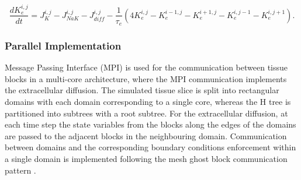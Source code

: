 		\begin{equation}
		\frac{d K_e^{i,j}}{dt} = J_K^{i,j} - J_{NaK}^{i,j} - J_{diff}^{i,j} - \frac{1}{\tau_e} 
		\left( 4  K_e^{i,j} -  K_e^{i-1,j} - K_e^{i+1,j} - K_e^{i,j-1} - K_e^{i,j+1}
		\right).
		\end{equation}
		
		\subsubsection{Parallel Implementation}	
		Message Passing Interface (MPI) is used for the communication between tissue blocks in a multi-core architecture, where the MPI communication implements the extracellular diffusion. The simulated tissue slice is split into rectangular domains with each domain corresponding to a single core, whereas the H tree is partitioned into subtrees with a root subtree.
		For the extracellular diffusion, at each time step the state variables from the blocks along the edges of the domains are passed to the adjacent blocks in the neighbouring domain. Communication between domains and the corresponding boundary conditions enforcement within a single domain is implemented following the mesh ghost block communication pattern \citep{Gropp2014}. 